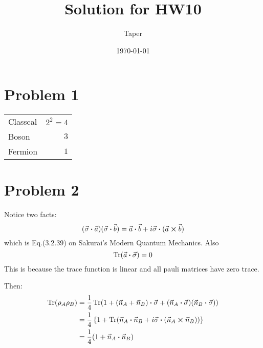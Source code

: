 \documentclass{article}
\title{Solution for HW10}
\date{\today}
\author{Taper}
\begin{document}
\maketitle
{}
\section*{Problem 1}
\begin{tabular}{l|r}
    Classcal & $2^2=4$ \\
    Boson    & $3$ \\
    Fermion & $1$
\end{tabular}

\section*{Problem 2}
Notice two facts:
\begin{equation}
    (\vec{\sigma}\vdot\vec{a})(\vec{\sigma}\vdot\vec{b})
    = \vec{a}\vdot\vec{b}+i\vec{\sigma}\vdot(\vec{a}\cross\vec{b})
\end{equation}
which is Eq.(3.2.39) on Sakurai's Modern Quantum Mechanics. Also
\begin{equation}
    \Tr(\vec{a}\vdot\vec{\sigma})=0
\end{equation}
This is because the trace function is linear and all pauli matrices
have zero trace.

Then:
\begin{align*}
    \Tr(\rho_A\rho_B)
    &=
    \frac{1}{4}\Tr(
        1+(\vec{n}_A+\vec{n}_B)\vdot\vec{\sigma}
        + (\vec{n}_A\vdot\vec{\sigma})(\vec{n}_B\vdot\vec{\sigma})
    )\\
    &=
    \frac{1}{4}\left\{
        1+\Tr(
            \vec{n}_A\vdot\vec{n}_B +
            i\vec{\sigma}\vdot(\vec{n}_A\cross\vec{n}_B)
    )\right\}\\
    &=\frac{1}{4}(1+\vec{n}_A\vdot\vec{n}_B)
\end{align*}
\end{document}
